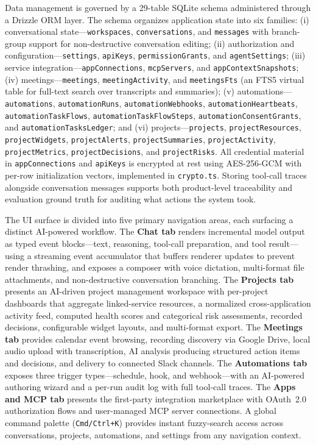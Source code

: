 \documentclass[conference]{IEEEtran}
\begin{document}
Data management is governed by a 29-table SQLite schema administered through a Drizzle ORM layer. The schema organizes application state into six families: (i) conversational state---\texttt{workspaces}, \texttt{conversations}, and \texttt{messages} with branch-group support for non-destructive conversation editing; (ii) authorization and configuration---\texttt{settings}, \texttt{apiKeys}, \texttt{permissionGrants}, and \texttt{agentSettings}; (iii) service integration---\texttt{appConnections}, \texttt{mcpServers}, and \texttt{appContextSnapshots}; (iv) meetings---\texttt{meetings}, \texttt{meetingActivity}, and \texttt{meetingsFts} (an FTS5 virtual table for full-text search over transcripts and summaries); (v) automations---\texttt{automations}, \texttt{automationRuns}, \texttt{automationWebhooks}, \texttt{automationHeartbeats}, \texttt{automationTaskFlows}, \texttt{automationTaskFlowSteps}, \texttt{automationConsentGrants}, and \texttt{automationTasksLedger}; and (vi) projects---\texttt{projects}, \texttt{projectResources}, \texttt{projectWidgets}, \texttt{projectAlerts}, \texttt{projectSummaries}, \texttt{projectActivity}, \texttt{projectMetrics}, \texttt{projectDecisions}, and \texttt{projectRisks}. All credential material in \texttt{appConnections} and \texttt{apiKeys} is encrypted at rest using AES-256-GCM with per-row initialization vectors, implemented in \texttt{crypto.ts}. Storing tool-call traces alongside conversation messages supports both product-level traceability and evaluation ground truth for auditing what actions the system took.

The UI surface is divided into five primary navigation areas, each surfacing a distinct AI-powered workflow. The \textbf{Chat tab} renders incremental model output as typed event blocks---text, reasoning, tool-call preparation, and tool result---using a streaming event accumulator that buffers renderer updates to prevent render thrashing, and exposes a composer with voice dictation, multi-format file attachments, and non-destructive conversation branching. The \textbf{Projects tab} presents an AI-driven project management workspace with per-project dashboards that aggregate linked-service resources, a normalized cross-application activity feed, computed health scores and categorical risk assessments, recorded decisions, configurable widget layouts, and multi-format export. The \textbf{Meetings tab} provides calendar event browsing, recording discovery via Google Drive, local audio upload with transcription, AI analysis producing structured action items and decisions, and delivery to connected Slack channels. The \textbf{Automations tab} exposes three trigger types---schedule, hook, and webhook---with an AI-powered authoring wizard and a per-run audit log with full tool-call traces. The \textbf{Apps and MCP tab} presents the first-party integration marketplace with OAuth~2.0 authorization flows and user-managed MCP server connections. A global command palette (\texttt{Cmd/Ctrl+K}) provides instant fuzzy-search access across conversations, projects, automations, and settings from any navigation context.
\end{document}
